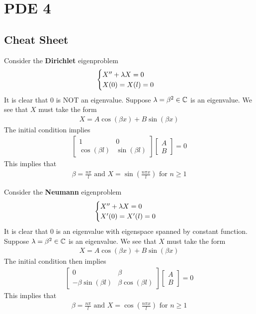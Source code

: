 \documentclass{report}
\begin{document}
\chapter{PDE 4}
\section{Cheat Sheet}
\begin{mdframed}
Consider the \textbf{Dirichlet} eigenproblem 
\begin{align*}
\begin{cases}
  X''+ \lambda X=0 \\
  X(0)=X(l)=0
\end{cases}
\end{align*}
It is clear that $0$ is NOT an eigenvalue. Suppose  $\lambda =\beta ^2\in\mathbb{C}$ is an eigenvalue. We see that $X$ must take the form
\begin{align*}
X= A \cos (\beta x)+ B \sin (\beta x)
\end{align*}
The initial condition implies 
\begin{align*}
\begin{bmatrix}
  1 & 0  \\
  \cos (\beta l) & \sin (\beta l)
\end{bmatrix} \begin{bmatrix}
A\\
B
\end{bmatrix}=0 
\end{align*}
This implies that 
\begin{align*}
\beta = \frac{n \pi  }{l}\text{ and } X= \sin ( \frac{n \pi  x}{l})\text{ for }n\geq 1
\end{align*}
\end{mdframed}
\begin{mdframed}
  Consider the \textbf{Neumann} eigenproblem 
\begin{align*}
\begin{cases}
  X'' + \lambda X=0 \\
  X'(0)=X'(l)=0
\end{cases}
\end{align*}
It is clear that $0$ is an eigenvalue with eigenspace spanned by constant function. Suppose $\lambda =\beta ^2\in\mathbb{C}$ is an eigenvalue. We see that $X$ must take the form 
 \begin{align*}
X= A\cos (\beta x) + B\sin (\beta x)
\end{align*}
The initial condition then implies 
\begin{align*}
\begin{bmatrix}
  0 & \beta \\
  -\beta  \sin (\beta l) & \beta  \cos (\beta l)
\end{bmatrix}\begin{bmatrix}
A\\
B
\end{bmatrix}=0 
\end{align*}
This implies that 
\begin{align*}
\beta = \frac{n \pi  }{l} \text{ and }X= \cos (\frac{n \pi  x}{l})\text{ for }n\geq 1
\end{align*}
\end{mdframed}
\end{document}
